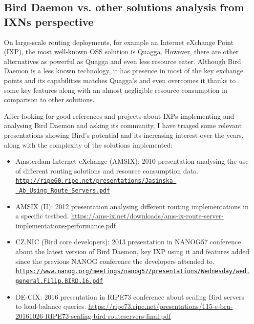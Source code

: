 \newpage
\begin{appendices}

\chapter{Bird Daemon vs. other solutions analysis from IXNs perspective}
\label{app:ch:blinks}

On large-scale routing deployments, for example an Internet eXchange Point (IXP), the most well-known OSS solution is Quagga. However, there are other alternatives as powerful as Quagga and even less resource eater. Although Bird Daemon is a less known technology, it has presence in most of the key exchange points and its capabilities matches Quagga's and even overcomes it thanks to some key features along with an almost negligible resource consumption in comparison to other solutions.

After looking for good references and projects about IXPs implementing and analysing Bird Daemon and asking its community, I have triaged some relevant presentations showing Bird's potential and its increasing interest over the years, along with the complexity of the solutions implemented:

\begin{itemize}
    \item Amsterdam Internet eXchange (AMSIX): 2010 presentation analysing the use of different routing solutions and resource consumption data. \href{http://ripe60.ripe.net/presentations/Jasinska-_Ab_Using_Route_Servers.pdf}{\nolinkurl{http://ripe60.ripe.net/presentations/Jasinska-\_Ab\_Using\_Route\_Servers.pdf}}
    
    \item AMSIX (II): 2012 presentation analysing different routing implementations in a specific testbed. \href{https://ams-ix.net/downloads/ams-ix-route-server-implementations-performance.pdf}{https://ams-ix.net/downloads/ams-ix-route-server-implementations-performance.pdf}

    \item CZ.NIC (Bird core developers): 2013 presentation in NANOG57 conference about the latest version of Bird Daemon, key IXP using it and features added since the previous NANOG conference the developers attended to. \href{https://www.nanog.org/meetings/nanog57/presentations/Wednesday/wed.general.Filip.BIRD.16.pdf}{\nolinkurl{https://www.nanog.org/meetings/nanog57/presentations/Wednesday/wed.general.Filip.BIRD.16.pdf}}

    \item DE-CIX: 2016 presentation in RIPE73 conference about scaling Bird servers to load-balance queries. \url{https://ripe73.ripe.net/presentations/115-e-bru-20161026-RIPE73-scaling-bird-routeservers-final.pdf}
    

\end{itemize}
\end{appendices}

